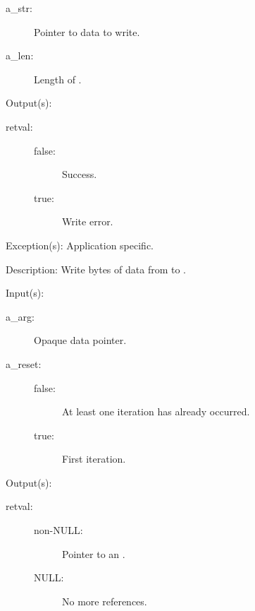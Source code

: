 \begin{capi}
\begin{capilist}
\begin{description}
		\item[a\_str: ]
			Pointer to data to write.
		\item[a\_len: ]
			Length of .
		\end{description}
	\item[Output(s): ]
		\begin{description}\item[]
		\item[retval: ]
			\begin{description}\item[]
			\item[false: ]
				Success.
			\item[true: ]
				Write error.
			\end{description}
		\end{description}
	\item[Exception(s): ] Application specific.
	\item[Description: ]
		Write  bytes of data from  to
		.
	\end{capilist}
\label{cw_nxo_file_ref_iter_t}
	\begin{capilist}
	\item[Input(s): ]
		\begin{description}\item[]
		\item[a\_arg: ]
			Opaque data pointer.
		\item[a\_reset: ]
			\begin{description}\item[]
			\item[false: ]
				At least one iteration has already occurred.
			\item[true: ]
				First iteration.
			\end{description}
		\end{description}
	\item[Output(s): ]
		\begin{description}\item[]
		\item[retval: ]
			\begin{description}\item[]
			\item[non-NULL: ]
				Pointer to an .
			\item[NULL: ]
				No more references.

\end{description}
\end{description}
\end{capilist}
\end{capi}

